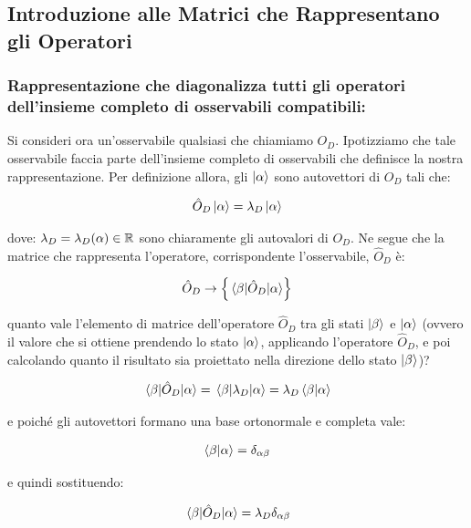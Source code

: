 \subsection{Introduzione alle Matrici che Rappresentano gli Operatori}
	
\subsubsection{Rappresentazione che diagonalizza tutti gli operatori dell'insieme completo di osservabili compatibili:}

	Si consideri ora un'osservabile qualsiasi che chiamiamo $O_D$. Ipotizziamo che tale osservabile faccia parte dell'insieme completo di osservabili che definisce la nostra rappresentazione. Per definizione allora, gli $\ket{\alpha}$ sono autovettori di $O_D$ tali che:
	
\begin{align*}
	\hat{O}_D \ket{\alpha} = \lambda_D \ket{\alpha}
\end{align*}

	dove: $\lambda_D = \lambda_D\qty(\alpha) \in \mathbb{R}$ sono chiaramente gli autovalori di $O_D$. Ne segue che
la matrice che rappresenta l'operatore, corrispondente l'osservabile, $\hat{O}_D$ è:
	
\begin{align*}
	\hat{O}_D \to \qty{\mel{\beta}{\hat{O}_D}{\alpha}} 
\end{align*}
	
	quanto vale l'elemento di matrice dell'operatore $\hat{O}_D$ tra gli stati $\ket{\beta}$ e $\ket{\alpha}$ (ovvero il valore che si ottiene prendendo lo stato $\ket{\alpha}$, applicando l'operatore $\hat{O}_D$, e poi calcolando quanto il risultato sia proiettato nella direzione dello stato $\ket{\beta}$)?

\begin{align*}
	\mel{\beta}{\hat{O}_D}{\alpha} = \mel{\beta}{\lambda_D}{\alpha} = \lambda_D \braket{\beta}{\alpha}
\end{align*}

	e poiché gli autovettori formano una base ortonormale e completa vale:
	
\begin{align*}
	\braket{\beta}{\alpha} = \delta_{\alpha \beta}
\end{align*}

	e quindi sostituendo:

\begin{align*}
	\mel{\beta}{\hat{O}_D}{\alpha}  = \lambda_D \delta_{\alpha \beta}
\end{align*}

